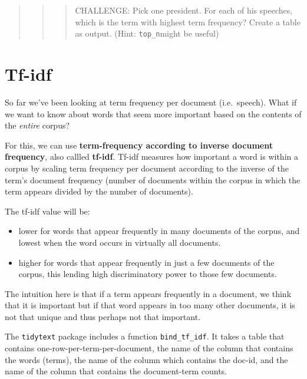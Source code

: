 \documentclass[
]{book}
\providecommand{\tightlist}{%
  \setlength{\itemsep}{0pt}\setlength{\parskip}{0pt}}
\begin{document}
\begin{quote}
\begin{quote}
\begin{quote}
CHALLENGE: Pick one president. For each of his speeches, which is the term with highest term frequency? Create a table as output. (Hint: \texttt{top\_n}might be useful)
\end{quote}
\end{quote}
\end{quote}

\section{Tf-idf}\label{tf-idf}

So far we've been looking at term frequency per document (i.e.~speech). What if we want to know about words that seem more important based on the contents of the \emph{entire} corpus?

For this, we can use \textbf{term-frequency according to inverse document frequency}, also callled \textbf{tf-idf}. Tf-idf measures how important a word is within a corpus by scaling term frequency per document according to the inverse of the term's document frequency (number of documents within the corpus in which the term appears divided by the number of documents).

The tf-idf value will be:

\begin{itemize}
\tightlist
\item
  lower for words that appear frequently in many documents of the corpus, and lowest when the word occurs in virtually all documents.
\item
  higher for words that appear frequently in just a few documents of the corpus, this lending high discriminatory power to those few documents.
\end{itemize}

The intuition here is that if a term appears frequently in a document, we think that it is important but if that word appears in too many other documents, it is not that unique and thus perhaps not that important.

The \texttt{tidytext} package includes a function \texttt{bind\_tf\_idf}. It takes a table that contains one-row-per-term-per-document, the name of the column that contains the words (terms), the name of the column which contains the doc-id, and the name of the column that contains the document-term counts.
\end{document}

